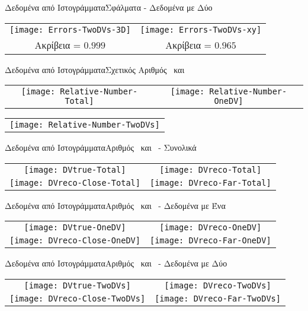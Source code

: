 \begin{frame}{Δεδομένα από Ιστογράμματα}{Σφάλματα - Δεδομένα με Δύο \dvtrue}
	\centering
	\begin{tabular}{c c}
		\texttt{[image: Errors-TwoDVs-3D]} & 
		\texttt{[image: Errors-TwoDVs-xy]} \\[4mm]
		\small{Ακρίβεια = $0.999$} & \small{Ακρίβεια = $0.965$}
	\end{tabular}
\end{frame}

\begin{frame}{Δεδομένα από Ιστογράμματα}{Σχετικός Αριθμός \dvreco\ και \dvtrue}
	\centering
	\begin{tabular}{c c}
		\texttt{[image: Relative-Number-Total]} &
		\texttt{[image: Relative-Number-OneDV]} 
	\end{tabular}
	\begin{tabular}{c}
		\texttt{[image: Relative-Number-TwoDVs]}
	\end{tabular}
\end{frame}

\begin{frame}{Δεδομένα από Ιστογράμματα}{Αριθμός \dvreco\ και \dvtrue\ - Συνολικά}
	\centering
	\begin{tabular}{c c}
		\texttt{[image: DVtrue-Total]} &
		\texttt{[image: DVreco-Total]} \\
		\texttt{[image: DVreco-Close-Total]} &
		\texttt{[image: DVreco-Far-Total]}
	\end{tabular}
\end{frame}

\begin{frame}{Δεδομένα από Ιστογράμματα}{Αριθμός \dvreco\ και \dvtrue\ - Δεδομένα με Ένα \dvtrue}
	\centering
	\begin{tabular}{c c}
		\texttt{[image: DVtrue-OneDV]} &
		\texttt{[image: DVreco-OneDV]} \\
		\texttt{[image: DVreco-Close-OneDV]} &
		\texttt{[image: DVreco-Far-OneDV]}
	\end{tabular}
\end{frame}

\begin{frame}{Δεδομένα από Ιστογράμματα}{Αριθμός \dvreco\ και \dvtrue\ - Δεδομένα με Δύο \dvtrue}
	\centering
	\begin{tabular}{c c}
		\texttt{[image: DVtrue-TwoDVs]} &
		\texttt{[image: DVreco-TwoDVs]} \\
		\texttt{[image: DVreco-Close-TwoDVs]} &
		\texttt{[image: DVreco-Far-TwoDVs]}
	\end{tabular}
\end{frame}